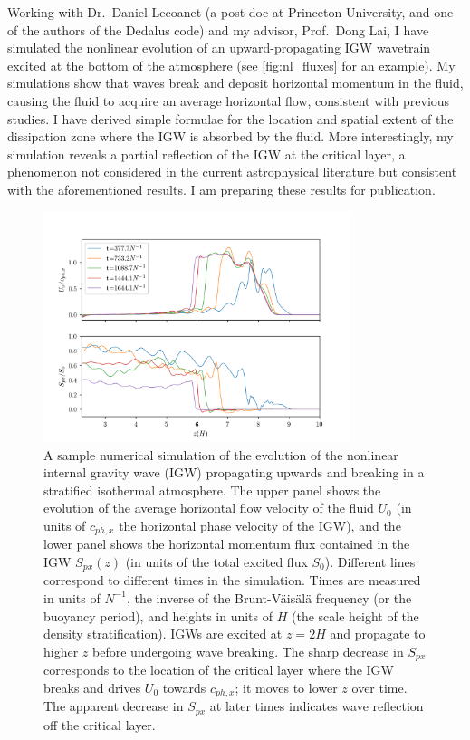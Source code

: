 \documentclass[12pt,
        usenames, %
        dvipsnames %
    ]{article}
\begin{document}
Working with Dr.\ Daniel Lecoanet (a post-doc at Princeton University, and one
of the authors of the Dedalus code) and my advisor, Prof.\ Dong Lai, I have
simulated the nonlinear evolution of an upward-propagating IGW wavetrain excited
at the bottom of the atmosphere (see \autoref{fig:nl_fluxes} for an example). My
simulations show that waves break and deposit horizontal momentum in the fluid,
causing the fluid to acquire an average horizontal flow, consistent with
previous studies\cite{fullerII}. I have derived simple formulae for the location
and spatial extent of the dissipation zone where the IGW is absorbed by the
fluid. More interestingly, my simulation reveals a partial reflection of the IGW
at the critical layer\cite{me}, a phenomenon not considered in the current
astrophysical literature but consistent with the aforementioned
results\cite{winters1994}. I am preparing these results for
publication\cite{me}.

\begin{figure}[!h]
    \centering
    \includegraphics[width=0.8\textwidth]{nl_fluxes.png}
    \caption{A sample numerical simulation of the evolution of the nonlinear
    internal gravity wave (IGW) propagating upwards and breaking in a stratified
    isothermal atmosphere. The upper panel shows the evolution of the average
    horizontal flow velocity of the fluid $U_0$ (in units of $c_{ph,x}$ the
    horizontal phase velocity of the IGW), and the lower panel shows the
    horizontal momentum flux contained in the IGW $S_{px}(z)$ (in units of the
    total excited flux $S_0$). Different lines correspond to different times in
    the simulation. Times are measured in units of $N^{-1}$, the inverse of the
    Brunt-V\"ais\"al\"a frequency (or the buoyancy period), and heights in units
    of $H$ (the scale height of the density stratification). IGWs are excited at
    $z = 2H$ and propagate to higher $z$ before undergoing wave breaking. The
    sharp decrease in $S_{px}$ corresponds to the location of the critical layer
    where the IGW breaks and drives $U_0$ towards $c_{ph, x}$; it moves to lower
    $z$ over time. The apparent decrease in $S_{px}$ at later times indicates
    wave reflection off the critical layer.}\label{fig:nl_fluxes}
\end{figure}
\end{document}
